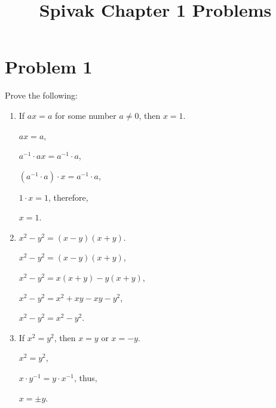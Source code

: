 \documentclass{article}
\title{Spivak Chapter 1 Problems}
\begin{document}
\maketitle

\section{Problem 1}
Prove the following:
\begin{enumerate}
    \item If $ax=a$ for some number $a \neq 0$, then $x = 1$.
       
        $ax = a$,

        $a^{-1} \cdot ax = a^{-1} \cdot a$,

        $(a^{-1} \cdot a) \cdot x = a^{-1} \cdot a$,

        $1 \cdot x = 1$, therefore,

        $x=1$.

    \item $x^2 - y^2 = (x-y)(x+y)$.

        $x^2 - y^2 = (x-y)(x+y)$,

        $x^2 - y^2 = x(x+y) - y(x+y)$,

        $x^2 - y^2 = x^2 + xy - xy - y^2$,

        $x^2 - y^2 = x^2 - y^2$.

    \item If $x^2 = y^2$, then $x = y$ or $x = -y$.
        
        $x^2 = y^2$,

        $x \cdot y^{-1} = y \cdot x^{-1}$, thus,

        $x = \pm y$.

\end{enumerate}
\end{document}
